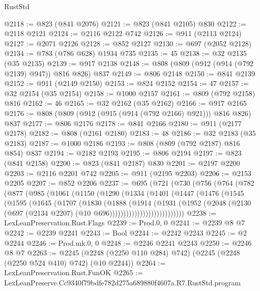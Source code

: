 \begin{lexlean}{RustStd}
\begin{coremodule}
@2118 := @823 (@841 @2076)
@2121 := @823 (@841 @2105) @830
@2122 := @2118 @2121
@2124 := @2116 @2122 @742
@2126 := @911 (@2113 @2124)
@2127 := @2071 @2126
@2128 := @852 @2127
@2130 := @697 (@2052 @2128)
@2134 := @783 (@786 @628) @1934 @735
@2135 := 45
@2138 := @32 @2135 (@35 @2135)
@2139 := @917 @2138
@2148 := @808 (@809 (@912 (@914 (@792 @2139) @947)) @816 @826) @837
@2149 := @806 @2148
@2150 := @841 @2139
@2152 := @911 (@2149 @2150)
@2153 := @824 @2152
@2154 := 47
@2157 := @32 @2154 (@35 @2154)
@2158 := @1000 @2157
@2161 := @809 (@792 @2158) @816
@2162 := 46
@2165 := @32 @2162 (@35 @2162)
@2166 := @917 @2165
@2176 := @808 (@809 (@912 (@915 (@914 (@792 @2166) @921))) @816 @826) @837
@2177 := @806 @2176
@2178 := @841 @2166
@2180 := @911 (@2177 @2178)
@2182 := @808 (@2161 @2180)
@2183 := 48
@2186 := @32 @2183 (@35 @2183)
@2187 := @1000 @2186
@2193 := @808 (@809 (@792 @2187) @816 @854) @837
@2194 := @2182 @2193
@2195 := @806 @2194
@2197 := @823 (@841 @2158)
@2200 := @823 (@841 @2187) @830
@2201 := @2197 @2200
@2203 := @2116 @2201 @742
@2205 := @911 (@2195 @2203)
@2206 := @2153 @2205
@2207 := @852 @2206
@2237 := @695
    (@721
      (@730
        (@756
          (@764
            (@782
              (@877
                (@985
                  (@1061
                    (@1150
                      (@1290
                        (@1334
                          (@1401
                            (@1447
                              (@1476
                                (@1545
                                  (@1595
                                    (@1645
                                      (@1707
                                        (@1830
                                          (@1888
                                            (@1914
                                              (@1931
                                                (@1952
                                                  (@2048
                                                    (@2130
                                                      (@697
                                                        (@2134 @2207)
                                                        (@10 @696)))))))))))))))))))))))))))
@2238 := LexLeanPreservation.Rust.Flags
@2239 := Prod.{0, 0}
@2241 := @2239 @8 @7
@2242 := @2239 @2241
@2243 := Bool
@2244 := @2242 @2243
@2245 := @2 @2244
@2246 := Prod.mk.{0, 0}
@2248 := @2246 @2241 @2243
@2250 := @2246 @8 @7
@2263 := @2245 (@2248 (@2250 @110 @284) @742) (@2245 (@2248 (@2250 @524 @410) @742) (@10 @2244))
@2264 := LexLeanPreservation.Rust.FunOK
@2265 := LexLeanPreserve.Cc9340f79bdfe782d275a689880f4607a.R7.RustStd.program

\end{coremodule}
\end{lexlean}
